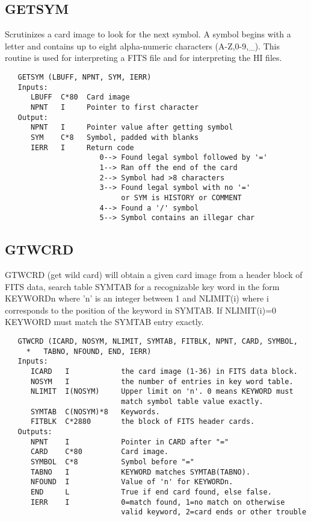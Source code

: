 \subsection{GETSYM}
Scrutinizes a card image to look for the next symbol.  A
symbol begins with a letter and contains up to eight alpha-numeric
characters (A-Z,0-9,\_).  This routine is used for interpreting a
FITS file and for interpreting the HI files.
\begin{verbatim}
   GETSYM (LBUFF, NPNT, SYM, IERR)
   Inputs:
      LBUFF  C*80  Card image
      NPNT   I     Pointer to first character
   Output:
      NPNT   I     Pointer value after getting symbol
      SYM    C*8   Symbol, padded with blanks
      IERR   I     Return code
                      0--> Found legal symbol followed by '='
                      1--> Ran off the end of the card
                      2--> Symbol had >8 characters
                      3--> Found legal symbol with no '='
                           or SYM is HISTORY or COMMENT
                      4--> Found a '/' symbol
                      5--> Symbol contains an illegar char
\end{verbatim}

\subsection{GTWCRD}
GTWCRD (get wild card) will obtain a given card image from a header
block of FITS data, search table SYMTAB for a recognizable key word
in the form KEYWORDn where 'n' is an integer between 1 and
NLIMIT(i) where i corresponds to the position of the keyword in
SYMTAB. If NLIMIT(i)=0 KEYWORD must match the SYMTAB entry exactly.
\begin{verbatim}
   GTWCRD (ICARD, NOSYM, NLIMIT, SYMTAB, FITBLK, NPNT, CARD, SYMBOL,
     *   TABNO, NFOUND, END, IERR)
   Inputs:
      ICARD   I            the card image (1-36) in FITS data block.
      NOSYM   I            the number of entries in key word table.
      NLIMIT  I(NOSYM)     Upper limit on 'n'. 0 means KEYWORD must
                           match symbol table value exactly.
      SYMTAB  C(NOSYM)*8   Keywords.
      FITBLK  C*2880       the block of FITS header cards.
   Outputs:
      NPNT    I            Pointer in CARD after "="
      CARD    C*80         Card image.
      SYMBOL  C*8          Symbol before "="
      TABNO   I            KEYWORD matches SYMTAB(TABNO).
      NFOUND  I            Value of 'n' for KEYWORDn.
      END     L            True if end card found, else false.
      IERR    I            0=match found, 1=no match on otherwise
                           valid keyword, 2=card ends or other trouble
\end{verbatim}

